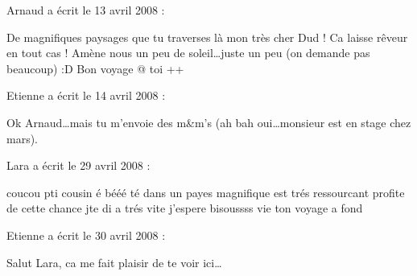 \medskip
Arnaud a écrit le 13 avril 2008 :
\begin{displayquote}
De magnifiques paysages que tu traverses là mon très cher Dud ! Ca laisse rêveur en tout cas !
Amène nous un peu de soleil\dots juste un peu (on demande pas beaucoup) :D
Bon voyage @ toi
++
\end{displayquote}

\medskip
Etienne a écrit le 14 avril 2008 :
\begin{displayquote}
Ok Arnaud\dots mais tu m'envoie des m\&m's (ah bah oui\dots monsieur est en stage chez mars).
\end{displayquote}

\medskip
Lara a écrit le 29 avril 2008 :
\begin{displayquote}
coucou pti cousin é bééé té dans un payes magnifique est trés ressourcant profite de cette chance jte di a trés vite j'espere bisoussss vie ton voyage a fond
\end{displayquote}

\medskip
Etienne a écrit le 30 avril 2008 :
\begin{displayquote}
Salut Lara, ca me fait plaisir de te voir ici\dots
\end{displayquote}

\vfill
